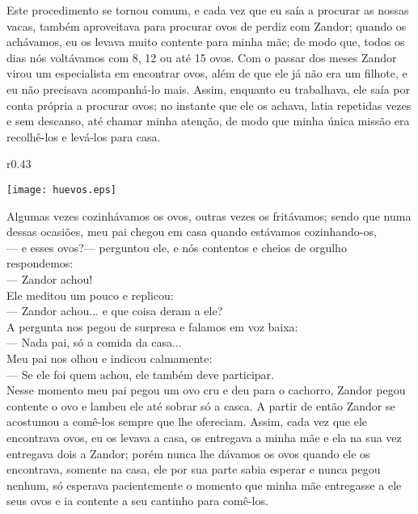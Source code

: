 Este procedimento se tornou comum, e cada vez que eu saía a procurar as nossas vacas, também aproveitava para procurar ovos de perdiz com Zandor; quando os achávamos, eu os levava muito contente para minha mãe; de modo que, todos os dias nós voltávamos com 8, 12 ou até 15 ovos. 
Com o passar dos meses Zandor virou um especialista em encontrar ovos, além de que ele já não era um filhote, e eu não precisava acompanhá-lo mais. Assim, enquanto eu trabalhava, ele saía por conta própria a procurar ovos; no instante que ele os achava, latia repetidas vezes e sem descanso, até chamar minha atenção, de modo que minha única missão era recolhê-los e levá-los para casa.
\ifdefined\EnableIncludeImages
\begin{wrapfigure}{r}{0.43\textwidth}
  \begin{center}
  \vspace{-20pt}
    \texttt{[image: huevos.eps]}
  \end{center}
  \vspace{-20pt}
\end{wrapfigure}
\fi
Algumas vezes cozinhávamos os ovos, outras vezes os fritávamos; sendo que numa dessas ocasiões, meu pai chegou em casa quando estávamos cozinhando-os,\\\indent
--- e esses ovos?--- perguntou ele, 
e nós contentos e cheios de orgulho respondemos:\\\indent 
--- Zandor achou!\\\indent
Ele meditou um pouco e replicou:\\\indent 
--- Zandor achou... e que coisa deram a ele?\\\indent
A pergunta nos pegou de surpresa e falamos em voz baixa:\\\indent 
--- Nada pai, só a comida da casa... \\\indent
Meu pai nos olhou e indicou calmamente: \\\indent
--- Se ele foi quem achou, ele também deve participar.\\\indent
Nesse momento meu pai pegou um ovo cru e deu para o cachorro, Zandor pegou contente o ovo e lambeu ele até sobrar só a casca. A partir de então Zandor se acostumou a comê-los sempre que lhe ofereciam. Assim, cada vez que ele encontrava ovos, eu os levava a casa, os entregava a minha mãe e ela na sua vez entregava dois a Zandor; porém nunca lhe dávamos os ovos quando ele os encontrava, somente na casa, ele por sua parte sabia esperar e nunca pegou nenhum, só esperava pacientemente o momento que minha mãe entregasse a ele seus ovos e ia contente a seu cantinho para comê-los.


